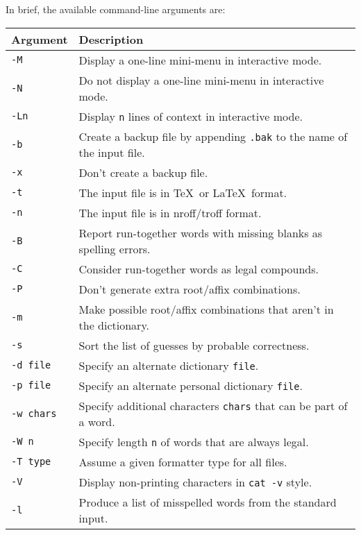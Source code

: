 \documentclass[noabs,nolof,twoside,11pt]{starlink}
\begin{document}
In brief, the available command-line arguments are:

\begin{tabular}{ll}
Argument & Description \\ \hline
\texttt{-M       } & Display a one-line mini-menu in interactive mode.\\
\texttt{-N       } & Do not display a one-line mini-menu in interactive mode.\\
\texttt{-Ln      } & Display \verb+n+ lines of context in interactive mode.\\

\texttt{-b       } & Create a backup file by appending \verb+.bak+ to the name of
                  the input file.\\
\texttt{-x       } & Don't create a backup file.\\

\texttt{-t       } & The input file is in \TeX\ or \LaTeX\ format.\\
\texttt{-n       } & The input file is in nroff/troff format.\\

\texttt{-B       } & Report run-together words with missing blanks as spelling
                  errors.\\
\texttt{-C       } & Consider run-together words as legal compounds.\\

\texttt{-P       } & Don't generate extra root/affix combinations.\\
\texttt{-m       } & Make possible root/affix combinations that aren't in the
                  dictionary.\\

\texttt{-s       } & Sort the list of guesses by probable correctness.\\
\texttt{-d file  } & Specify an alternate dictionary \verb+file+\@.\\
\texttt{-p file  } & Specify an alternate personal dictionary \verb+file+\@.\\
\texttt{-w chars } & Specify additional characters \verb+chars+ that can be part
                  of a word.\\
\texttt{-W n     } & Specify length \verb+n+ of words that are always legal.\\
\texttt{-T type  } & Assume a given formatter type for all files.\\

\texttt{-V       } & Display non-printing characters in \verb+cat -v+ style.\\
\texttt{-l       } & Produce a list of misspelled words from the standard input.\\


\end{tabular}
\end{document}
